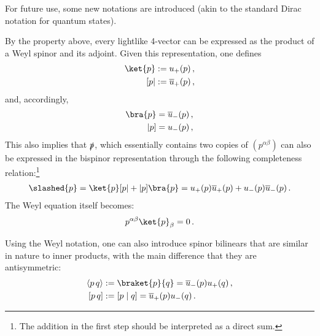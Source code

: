     For future use, some new notations are introduced (akin to the standard Dirac notation for quantum states).
    \begin{notation}
        By the property above, every lightlike 4-vector can be expressed as the product of a Weyl spinor and its adjoint. Given this representation, one defines
        \begin{gather}
            \begin{aligned}
                \ket{p} &:= u_+(p)\,,\\
                [p|&:= \overline{u}_+(p)\,, 
            \end{aligned}
        \end{gather}
        and, accordingly,
        \begin{gather}
            \begin{aligned}
                \bra{p} &= \overline{u}_-(p)\,,\\
                |p] &= u_-(p)\,, 
            \end{aligned}
        \end{gather}
        This also implies that $\slashed{p}$, which essentially contains two copies of $(p ^{\alpha\beta})$ can also be expressed in the bispinor representation through the following completeness relation:\footnote{The addition in the first step should be interpreted as a direct sum.}
        \begin{gather}
            \slashed{p} = \ket{p}[p| + |p]\bra{p} = u_+(p)\overline{u}_+(p) + u_-(p)\overline{u}_-(p)\,.
        \end{gather}
        The Weyl equation itself becomes:
        \begin{gather}
            p^{\alpha\beta}\ket{p}_\beta = 0\,.
        \end{gather}
    \end{notation}

    Using the Weyl notation, one can also introduce spinor bilinears that are similar in nature to inner products, with the main difference that they are antisymmetric:
    \begin{gather}
        \label{dirac:spinor_bilinears}
        \begin{aligned}
            \langle p\,q\rangle &:= \braket{p}{q} = \overline{u}_-(p)u_+(q)\,,\\
            [p\,q] &:= [p\mid q] = \overline{u}_+(p)u_-(q)\,.
        \end{aligned}
    \end{gather}

